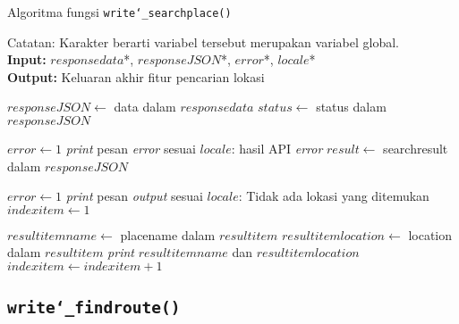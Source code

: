 \begin{algorithm}[h]
	\caption{Algoritma fungsi \texttt{write\char`_searchplace()}}
	\label{alg:design-write-searchplace}
	\vspace{-0.6\baselineskip}
	\begin{flushleft}
		Catatan: Karakter \textquotesingle *\textquotesingle\xspace berarti variabel tersebut merupakan variabel global. \\
		\textbf{Input:} $responsedata$*, $responseJSON$*, $error$*, $locale$* \\
		\textbf{Output:} Keluaran akhir fitur pencarian lokasi \\
	\end{flushleft}
	\vspace{-1.05\baselineskip}
	\begin{algorithmic}
		\State $responseJSON \gets$ data dalam $responsedata$
		\State $status \gets$ \textquotesingle\textquotesingle status\textquotesingle\textquotesingle\xspace dalam $responseJSON$
		
			\State $error \gets 1$
			\State \textit{print} pesan \textit{error} sesuai $locale$: hasil API \textit{error}
		\Else
			\State $result \gets$ \textquotesingle\textquotesingle searchresult\textquotesingle\textquotesingle\xspace dalam $responseJSON$
			
				\State $error \gets 1$
				\State \textit{print} pesan \textit{output} sesuai $locale$: Tidak ada lokasi yang ditemukan
			\Else
				\State $indexitem \gets 1$
				
				 
					\State $resultitemname \gets$ \textquotesingle\textquotesingle placename\textquotesingle\textquotesingle\xspace dalam $resultitem$
					\State $resultitemlocation \gets$ \textquotesingle\textquotesingle location\textquotesingle\textquotesingle\xspace dalam $resultitem$
					\State \textit{print} $resultitemname$ dan $resultitemlocation$
					\State $indexitem \gets indexitem + 1$
				\EndFor
			\EndIf
		\EndIf
	\end{algorithmic}
\end{algorithm}
	
\subsection{\texttt{write\char`_findroute()}}
\label{sec:design-code-write-findroute}

